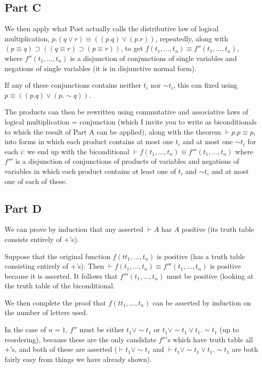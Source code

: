 \documentclass[12pt]{article}
\begin{document}
\subsection{Part C}

We then apply what Post actually calls the distributive law of logical multiplication, $p .(q \vee r) \equiv(( p.q) \vee( p.r))$, repeatedly, along with $(p \equiv q) \supset ((q \equiv r) \supset (p\equiv r))$, to get $f(t_1,\ldots,t_n) \equiv f''(t_1,\ldots,t_n)$, where $f''(t_1,\ldots,t_n)$ is a disjunction of conjunctions of single variables and negations of single variables (it is in disjunctive normal form).

If any of these conjunctions contains neither $t_i$ nor $\sim t_i$, this can fixed using $p \equiv ((p.q) \vee (p.\sim q))$. 

The products can then be rewritten using commutative and associative laws of logical multiplication = conjunction (which I invite you to write as biconditionals to which the result of Part A can be applied), along with the theorem $\vdash p .p \equiv p$,  into forms in which each product contains at most one $t_i$ and at most one $\sim t_i$ for each $i$:  we end up with the biconditional $\vdash f(t_1,\ldots,t_n) \equiv f'''(t_1,\ldots,t_n)$ where $f'''$ is a disjunction of conjunctions of products of variables and negations of variables in which each product contains at least one of $t_i$ and $\sim t_i$ and
at most one of each of these.

\subsection{Part D}

We can prove by induction that any asserted $\vdash A$ has $A$ positive (its truth table consists entirely of +'s).

Suppose that the original function $f(tt_1,\ldots,t_n)$ is positive (has a truth table consisting entirely of +'s).  Then $\vdash f(t_1,\ldots,t_n) \equiv f'''(t_1,\ldots,t_n)$ is positive because it is asserted.  It follows that $f'''(t_1,\ldots,t_n)$ must be positive (looking at the truth table of the biconditional.

We then complete the proof that $f(tt_1,\ldots,t_n)$  can be asserted by induction on the number of letters used.

In the case of $n=1$, $f''$ must be either $t_1 \vee \sim t_1$ or $t_1 \vee \sim t_1 \vee t_1.\sim t_1$ (up to reordering), because these are the only candidate $f''$'s which have truth table all +'s, and both of these are asserted
($\vdash t_1 \vee \sim t_1$ and $\vdash t_1 \vee \sim t_1 \vee t_1.\sim t_1$ are both fairly easy from things we have already shown).
\end{document}
